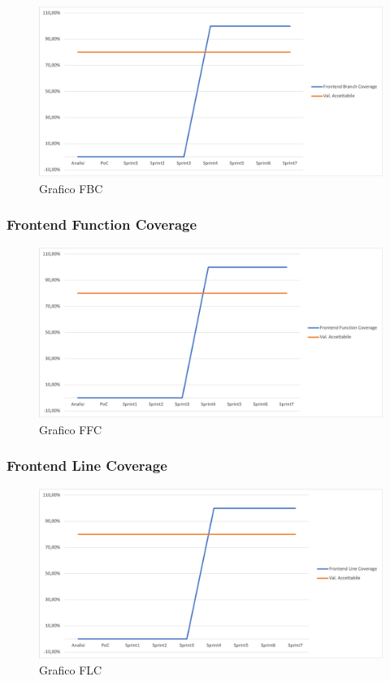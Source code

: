 \begin{figure}[H]
\centering
\includegraphics[width=1\textwidth]{src/img/Frontend Branch Coverage.png}
\caption{Grafico FBC}
\end{figure}

\subsubsection{Frontend Function Coverage}

\begin{figure}[H]
\centering
\includegraphics[width=1\textwidth]{src/img/Frontend Function Coverage.png}
\caption{Grafico FFC}
\end{figure}

\subsubsection{Frontend Line Coverage}

\begin{figure}[H]
\centering
\includegraphics[width=1\textwidth]{src/img/Frontend Line Coverage.png}
\caption{Grafico FLC}
\end{figure}



















